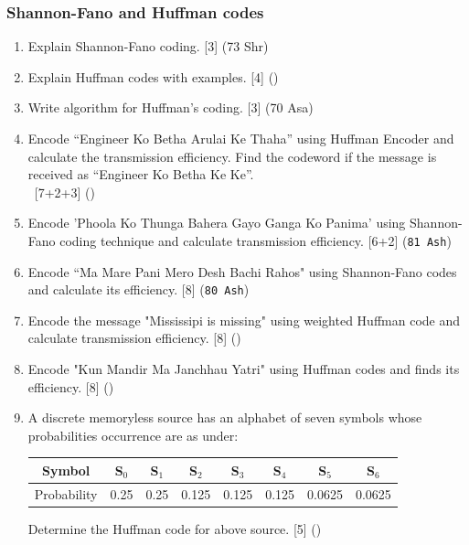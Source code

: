 \documentclass[12pt]{article}
\newcommand{\enter}{\\\textcolor{white}{1}}
\begin{document}
    \subsubsection{Shannon-Fano and Huffman codes}
      \begin{enumerate}
      	\item Explain Shannon-Fano coding. \hfill [3] (73 Shr)
      	
      	\item Explain Huffman codes with examples. \hfill [4] ()
      	
      	\item Write algorithm for Huffman's coding. \hfill [3] (70 Asa)
      	
        \item Encode “Engineer Ko Betha Arulai Ke Thaha” using Huffman Encoder and calculate the transmission efficiency. Find the codeword if the message is received as “Engineer Ko Betha Ke Ke”. 
        \enter\hfill [7+2+3] ()

        \item Encode 'Phoola Ko Thunga Bahera Gayo Ganga Ko Panima' using Shannon-Fano coding technique and calculate transmission efficiency. \hfill [6+2] (\texttt{81 Ash})

        \item Encode ``Ma Mare Pani Mero Desh Bachi Rahos" using Shannon-Fano codes and calculate its efficiency. \hfill [8] (\texttt{80 Ash})

        \item Encode the message "Mississipi is missing" using weighted Huffman code and calculate transmission efficiency. \hfill [8] ()

        \item Encode "Kun Mandir Ma Janchhau Yatri" using Huffman codes and finds its efficiency. \hfill [8] ()
        
        \item A discrete memoryless source has an alphabet of seven symbols whose probabilities occurrence are as under:
        \begin{tabular}{|c|c|c|c|c|c|c|c|}
        	\hline
        	Symbol & S$_0$ & S$_1$ & S$_2$ & S$_3$ & S$_4$ & S$_5$ & S$_6$ \\ \hline
        	Probability & 0.25 & 0.25 & 0.125 & 0.125 & 0.125 & 0.0625 & 0.0625 \\ \hline
        \end{tabular}
        Determine the Huffman code for above source. \hfill [5] ()
        

\end{enumerate}
\end{document}
